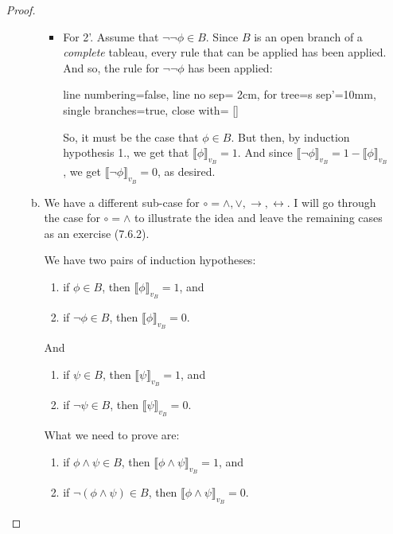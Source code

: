 \begin{enumerate}[\thesection.1]
\begin{proof}
\begin{enumerate}[(i)]
\begin{enumerate}[(a)]
\begin{itemize}
		\item For 2'. Assume that $\neg\neg \phi\in B$. Since $B$ is an open branch of a \emph{complete} tableau, every rule that can be applied has been applied. And so, the rule for $\neg\neg\phi$ has been applied:
		\begin{center}
					\begin{prooftree}
					{
					line numbering=false,
					line no sep= 2cm,
					for tree={s sep'=10mm},
					single branches=true,
					close with=\xmark
					}
					[\neg\neg\phi [\phi ] ]
					\end{prooftree}
			\end{center} 
		So, it must be the case that $\phi\in B$. But then, by induction hypothesis 1., we get that $\llbracket\phi\rrbracket_{v_B}=1$. And since $\llbracket\neg\phi\rrbracket_{v_B}=1-\llbracket\phi\rrbracket_{v_B}$, we get $\llbracket\neg\phi\rrbracket_{v_B}=0$, as desired.

		
		\end{itemize}
		
		\item We have a different sub-case for $\circ=\land,\lor,\to,\leftrightarrow$. I will go through the case for $\circ=\land$ to illustrate the idea and leave the remaining cases as an exercise (7.6.2).
		
		We have two pairs of induction hypotheses:
		\begin{enumerate}[1$_\phi$.]
	
		\item if $\phi\in B$, then $\llbracket\phi\rrbracket_{v_B}=1$, and 
		\item if $\neg \phi\in B$, then $\llbracket\phi\rrbracket_{v_B}=0$.
	
	\end{enumerate}
	
	And
	
	\begin{enumerate}[1$_\psi$.]
	
		\item if $\psi\in B$, then $\llbracket\psi\rrbracket_{v_B}=1$, and 
		\item if $\neg \psi\in B$, then $\llbracket\psi\rrbracket_{v_B}=0$.
	
	\end{enumerate}
	What we need to prove are:
	\begin{enumerate}
	
		\item if $\phi\land \psi\in B$, then $\llbracket\phi\land \psi\rrbracket_{v_B}=1$, and 
		\item if $\neg (\phi\land \psi)\in B$, then $\llbracket\phi\land \psi\rrbracket_{v_B}=0$.
	\end{enumerate}


\end{enumerate}
\end{enumerate}
\end{proof}
\end{enumerate}
